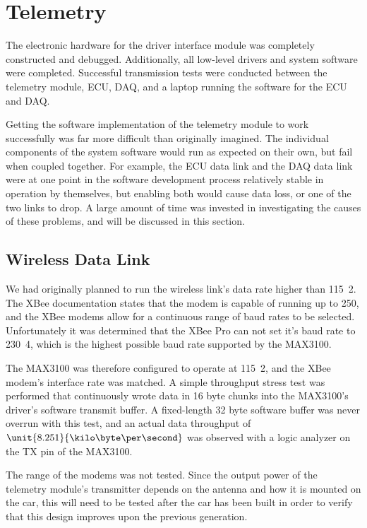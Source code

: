 \section{Telemetry}

The electronic hardware for the driver interface module was completely constructed and debugged. Additionally, all low-level drivers and system software were completed. Successful transmission tests were conducted between the telemetry module, ECU, DAQ, and a laptop running the software for the ECU and DAQ.

Getting the software implementation of the telemetry module to work successfully was far more difficult than originally imagined. The individual components of the system software would run as expected on their own, but fail when coupled together. For example, the ECU data link and the DAQ data link were at one point in the software development process relatively stable in operation by themselves, but enabling both would cause data loss, or one of the two links to drop. A large amount of time was invested in investigating the causes of these problems, and will be discussed in this section.

\subsection{Wireless Data Link}

We had originally planned to run the wireless link's data rate higher than \unit{115.2}{\kilo\bit\per\second}. The XBee documentation states that the modem is capable of running up to \unit{250}{\kilo\bit\per\second}, and the XBee modems allow for a continuous range of baud rates to be selected. Unfortunately it was determined that the XBee Pro can not set it's baud rate to \unit{230.4}{\kilo\bit\per\second}, which is the highest possible baud rate supported by the MAX3100.

The MAX3100 was therefore configured to operate at \unit{115.2}{\kilo\bit\per\second}, and the XBee modem's interface rate was matched. A simple throughput stress test was performed that continuously wrote data in 16 byte chunks into the MAX3100's driver's software transmit buffer. A fixed-length 32 byte software buffer was never overrun with this test, and an actual data throughput of $\unit{8.251}{\kilo\byte\per\second}$ was observed with a logic analyzer on the TX pin of the MAX3100.

The range of the modems was not tested. Since the output power of the telemetry module's transmitter depends on the antenna and how it is mounted on the car, this will need to be tested after the car has been built in order to verify that this design improves upon the previous generation.

